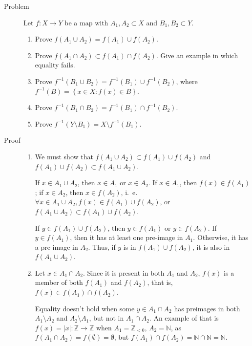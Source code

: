 \begin{description}
\item[Problem] Let $f : X \rightarrow Y$ be a map with $A_1, A_2 \subset X$ and
$B_1, B_2 \subset Y$.
\begin{enumerate}
\item Prove $f(A_1 \cup A_2) = f(A_1) \cup f(A_2)$.
\item Prove $f(A_1 \cap A_2) \subset f(A_1) \cap f(A_2)$. Give an example in
which equality fails.
\item Prove $f^{-1}(B_1 \cup B_2) = f^{-1} (B_1) \cup f^{-1} (B_2)$, where
$f^{-1}(B) = \left\{x \in X : f(x) \in B\right\}$.
\item Prove $f^{-1} (B_1 \cap B_2) = f^{-1}(B_1) \cap f^{-1} (B_2)$.
\item Prove $f^{-1} (Y \setminus B_1) = X \setminus f^{-1} (B_1)$.
\end{enumerate}

\item[Proof]
        \begin{enumerate}
                \item We must show that $f(A_1 \cup A_2) \subset f(A_1) \cup
                        f(A_2)$ and $f(A_1) \cup f(A_2) \subset f(A_1 \cup
                        A_2)$.

                        If $x \in A_1 \cup A_2$, then $x \in A_1$ or
                        $x \in A_2$. If $x \in A_1$, then $f(x) \in f(A_1)$;
                        if $x \in A_2$, then $x \in f(A_2)$, i.\ e. $\forall x
                        \in A_1 \cup A_2, f(x) \in f(A_1) \cup f(A_2)$, or
                        $f(A_1 \cup A_2) \subset f(A_1) \cup f(A_2)$.

                        If $y \in f(A_1) \cup f(A_2)$, then $y \in f(A_1)$ or
                        $y \in f(A_2)$. If $y \in f(A_1)$, then it has at least
                        one pre-image in $A_1$. Otherwise, it has a pre-image
                        in $A_2$. Thus, if $y$ is in $f(A_1) \cup f(A_2)$, it
                        is also in $f(A_1 \cup A_2)$.

                \item Let $x \in A_1 \cap A_2$. Since it is present in both
                        $A_1$ and $A_2$, $f(x)$ is a member of both $f(A_1)$
                        and $f(A_2)$, that is, $f(x) \in f(A_1) \cap f(A_2)$.

                        Equality doesn't hold when some $y \in A_1 \cap A_2$
                        has preimages in both $A_1 \setminus A_2$ and $A_2
                        \setminus A_1$, but not in $A_1 \cap A_2$. An example
                        of that is $f(x) = |x| : \mathbb{Z} \rightarrow
                        \mathbb{Z}$ when $A_1 = \mathbb{Z}_{< 0}$, $A_2 =
                        \mathbb{N}$, as $f(A_1 \cap A_2) = f(\emptyset) =
                        \emptyset$, but $f(A_1) \cap f(A_2) = \mathbb{N} \cap
                        \mathbb{N} = \mathbb{N}$.


\end{enumerate}
\end{description}
